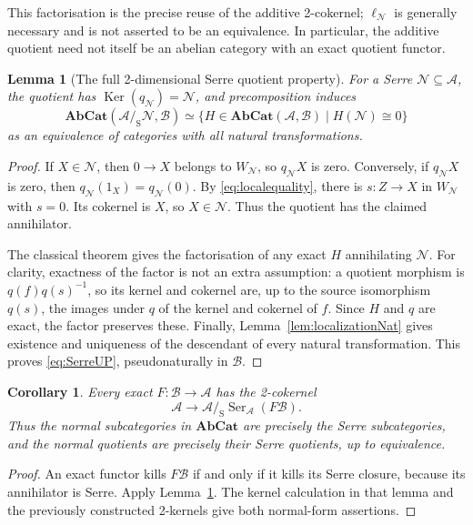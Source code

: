 \documentclass[11pt,reqno,a4paper]{amsart}
\newtheorem{lemma}[theorem]{Lemma}
\newtheorem{corollary}[theorem]{Corollary}
\theoremstyle{definition}
\theoremstyle{remark}
\newcommand{\A}{\mathcal{A}}
\newcommand{\N}{\mathcal{N}}
\newcommand{\0}{\mathbf{0}}
\renewcommand{\1}{\mathbf{1}}
\newcommand{\AbCat}{\mathbf{AbCat}}
\newcommand{\iso}{\cong}
\newcommand{\B}{\mathcal B}
\newcommand{\sq}[2]{#1/_{\!\mathrm S}#2}
\DeclareMathOperator{\Ker}{Ker}
\DeclareMathOperator{\Ser}{Ser}
\begin{document}
This factorisation is the precise reuse of the additive 2-cokernel;
$\ell_{\N}$ is generally necessary and is not asserted to be an
equivalence. In particular, the additive quotient need not itself be
an abelian category with an exact quotient functor.

\begin{lemma}[The full 2-dimensional Serre quotient property]\label{lem:SerreUP}
For a Serre $\N\subseteq\A$, the quotient has
$\Ker(q_{\N})=\N$, and precomposition induces
\begin{equation}\label{eq:SerreUP}
 \AbCat(\sq{\A}{\N},\B)\simeq
 \{H\in\AbCat(\A,\B)\mid H(\N)\iso0\}
\end{equation}
as an equivalence of categories with all natural transformations.
\end{lemma}
\begin{proof}
If $X\in\N$, then $0\to X$ belongs to $W_{\N}$, so $q_{\N}X$
is zero. Conversely, if $q_{\N}X$ is zero, then
$q_{\N}(1_X)=q_{\N}(0)$. By \eqref{eq:localequality}, there is
$s:Z\to X$ in $W_{\N}$ with $s=0$. Its cokernel is $X$, so
$X\in\N$. Thus the quotient has the claimed annihilator.

The classical theorem gives the factorisation of any exact $H$
annihilating $\N$. For clarity, exactness of the factor is not an
extra assumption: a quotient morphism is $q(f)q(s)^{-1}$, so its
kernel and cokernel are, up to the source isomorphism $q(s)$, the
images under $q$ of the kernel and cokernel of $f$. Since $H$ and
$q$ are exact, the factor preserves these. Finally,
Lemma~\ref{lem:localizationNat} gives existence and uniqueness of the
descendant of every natural transformation. This proves
\eqref{eq:SerreUP}, pseudonaturally in $\B$.
\end{proof}

\begin{corollary}\label{cor:Serrecoker}
Every exact $F:\B\to\A$ has the 2-cokernel
\begin{equation}\label{eq:Serrecoker}
 \A\longrightarrow\sq{\A}{\Ser_{\A}(F\B)}.
\end{equation}
Thus the normal subcategories in $\AbCat$ are precisely the Serre
subcategories, and the normal quotients are precisely their Serre
quotients, up to equivalence.
\end{corollary}
\begin{proof}
An exact functor kills $F\B$ if and only if it kills its Serre closure,
because its annihilator is Serre. Apply Lemma~\ref{lem:SerreUP}.
The kernel calculation in that lemma and the previously constructed
2-kernels give both normal-form assertions.
\end{proof}
\end{document}
